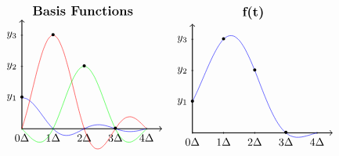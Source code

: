 \documentclass{article}
\begin{document}
\[
    \begin{array}{ccc}
        \begin{tikzpicture}
            \draw[thick,->] (0, 0) -- (4.5,0);
            \draw[thick,->] (0,0) -- (0,3.5);
            \foreach \x in {0,1, 2, 3, 4}
                \draw (\x cm,1pt) -- (\x cm,-1pt) node[anchor=north] {$\x \Delta$};
            \foreach \y in {1,2,3}
                \draw (1pt,\y cm) -- (-1pt,\y cm) node[anchor=east] {$y_{\y}$};
                \draw[scale=1,domain=0.001:4,smooth,variable=\x,blue] plot (\x,{sin((\x r * pi))/(\x * pi)});
                \draw[scale=1,domain=0.001:4,smooth,variable=\x,red] plot (\x,{3*sin(((\x - 1) r * pi))/((\x - 1) * pi)});
                \draw[scale=1,domain=0.001:4,smooth,variable=\x,green] plot (\x,{2*sin(((\x - 2) r * pi))/((\x - 2) * pi)});
            \foreach \Point in {(0,1), (2,2), (1,3), (3, 0)}{
                \node at \Point {\textbullet};
            }
            \node[above,font=\large\bfseries] at (current bounding box.north) {Basis Functions};
        \end{tikzpicture} &
        \begin{tikzpicture}
            \draw[thick,->] (0, 0) -- (4.5,0);
            \draw[thick,->] (0,0) -- (0,3.5);
            \foreach \x in {0,1, 2, 3, 4}
                \draw (\x cm,1pt) -- (\x cm,-1pt) node[anchor=north] {$\x \Delta$};
            \foreach \y in {1,2,3}
                \draw (1pt,\y cm) -- (-1pt,\y cm) node[anchor=east] {$y_{\y}$};
                \draw[scale=1,domain=0.001:4,smooth,variable=\x,blue] plot 
                (\x,{sin((\x r * pi))/(\x * pi) + 3*sin(((\x - 1) r * pi))/((\x - 1) * pi)+2*sin(((\x - 2) r * pi))/((\x - 2) * pi)});
            \foreach \Point in {(0,1), (2,2), (1,3), (3, 0)}{
                \node at \Point {\textbullet};
            }
            \node[above,font=\large\bfseries] at (current bounding box.north) {f(t)};
        \end{tikzpicture}
    \end{array}
\]
\end{document}
